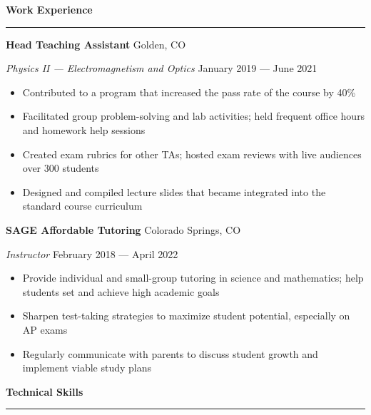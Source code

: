 \documentclass{article}
\begin{document}
\vspace{1em}

\textbf{\Large{Work Experience}} \\[-0.5em]
\rule{\textwidth}{1pt}

\hspace{1.5em} \textbf{Head Teaching Assistant} \hfill Golden, CO

\hspace{1.5em} \textit{Physics II --- Electromagnetism and Optics} \hfill January 2019 --- June 2021

\vspace{-0.5em}

\begin{itemize}[leftmargin=6.0em]
\setlength{\itemsep}{0em}
\item Contributed to a program that increased the pass rate of the course by 40\%
\item Facilitated group problem-solving and lab activities; held frequent office hours and homework help sessions
\item Created exam rubrics for other TAs; hosted exam reviews with live audiences over 300 students
\item Designed and compiled lecture slides that became integrated into the standard course curriculum
\end{itemize}

\hspace{1.5em} \textbf{SAGE Affordable Tutoring} \hfill Colorado Springs, CO

\hspace{1.5em} \textit{Instructor} \hfill February 2018 --- April 2022

\vspace{-0.5em}

\begin{itemize}[leftmargin=6.0em]
\setlength{\itemsep}{0em}
\item Provide individual and small-group tutoring in science and mathematics; help students set and achieve high academic goals
\item Sharpen test-taking strategies to maximize student potential, especially on AP exams
\item Regularly communicate with parents to discuss student growth and implement viable study plans
\end{itemize}

\vspace{1em}

\textbf{\Large{Technical Skills}} \\[-0.5em]
\rule{\textwidth}{1pt}
\end{document}
